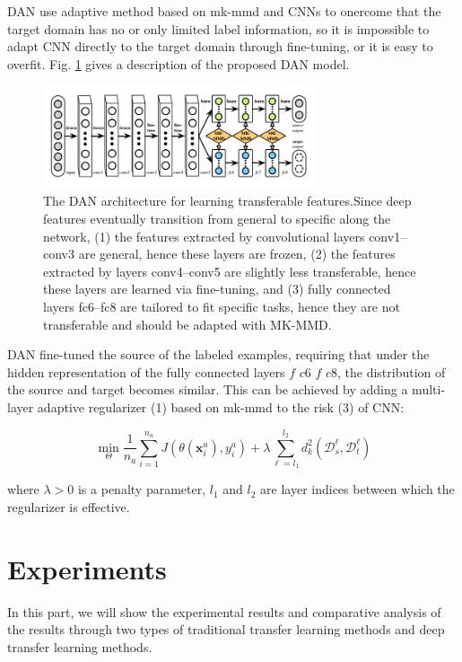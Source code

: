 \documentclass[conference]{IEEEtran}
\begin{document}
DAN use adaptive method based on mk-mmd and CNNs to onercome that the target domain has no or only limited label information, so it is impossible to adapt CNN directly to the target domain through fine-tuning, or it is easy to overfit. Fig. \ref{kFig2} gives a description of the proposed DAN model.

\begin{center}
	\begin{figure}[htbp]
		\centering
		\label{kFig2}
		\includegraphics[width=8cm]{image/DAN.png}
		\caption{The DAN architecture for learning transferable features.Since deep features eventually transition from general to specific along the network, (1) the features extracted by convolutional layers conv1–conv3 are general, hence these layers are frozen, (2) the features extracted by layers conv4–conv5 are slightly less transferable, hence these layers are learned via fine-tuning, and (3) fully connected layers fc6–fc8 are tailored to fit specific tasks, hence they are not transferable and should be adapted with MK-MMD.\cite{Long2015Learning}}
	\end{figure}
\end{center}

DAN fine-tuned the source of the labeled examples, requiring that under the hidden representation of the fully connected layers $f$ $c6$ $f$ $c8$, the distribution of the source and target becomes similar. This can be achieved by adding a multi-layer adaptive regularizer (1) based on mk-mmd to the risk (3) of CNN:

$$
\min _{\Theta} \frac{1}{n_{a}} \sum_{i=1}^{n_{a}} J\left(\theta\left(\mathbf{x}_{i}^{a}\right), y_{i}^{a}\right)+\lambda \sum_{\ell=l_{1}}^{l_{2}} d_{k}^{2}\left(\mathcal{D}_{s}^{\ell}, \mathcal{D}_{t}^{\ell}\right)
$$


where $\lambda > 0$ is a penalty parameter, $l_1$ and $l_2$ are layer indices between which the regularizer is effective.

\section{Experiments}

In this part, we will show the experimental results and comparative analysis of the results through two types of traditional transfer learning methods and deep transfer learning methods.
\end{document}
